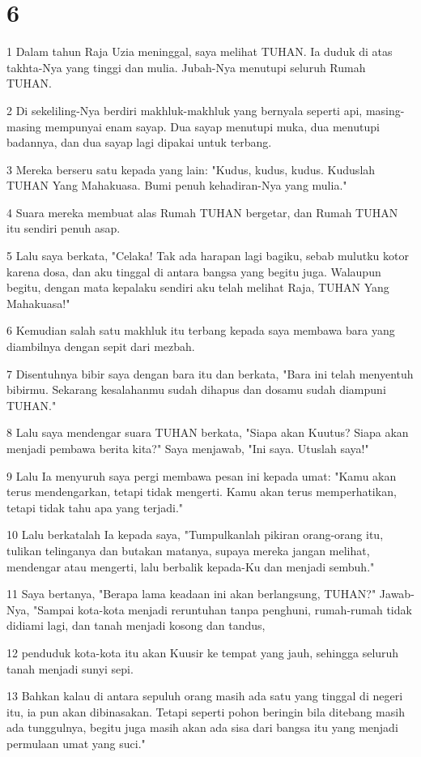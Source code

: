 \chapter{6}

\par 1 Dalam tahun Raja Uzia meninggal, saya melihat TUHAN. Ia duduk di atas takhta-Nya yang tinggi dan mulia. Jubah-Nya menutupi seluruh Rumah TUHAN.
\par 2 Di sekeliling-Nya berdiri makhluk-makhluk yang bernyala seperti api, masing-masing mempunyai enam sayap. Dua sayap menutupi muka, dua menutupi badannya, dan dua sayap lagi dipakai untuk terbang.
\par 3 Mereka berseru satu kepada yang lain: "Kudus, kudus, kudus. Kuduslah TUHAN Yang Mahakuasa. Bumi penuh kehadiran-Nya yang mulia."
\par 4 Suara mereka membuat alas Rumah TUHAN bergetar, dan Rumah TUHAN itu sendiri penuh asap.
\par 5 Lalu saya berkata, "Celaka! Tak ada harapan lagi bagiku, sebab mulutku kotor karena dosa, dan aku tinggal di antara bangsa yang begitu juga. Walaupun begitu, dengan mata kepalaku sendiri aku telah melihat Raja, TUHAN Yang Mahakuasa!"
\par 6 Kemudian salah satu makhluk itu terbang kepada saya membawa bara yang diambilnya dengan sepit dari mezbah.
\par 7 Disentuhnya bibir saya dengan bara itu dan berkata, "Bara ini telah menyentuh bibirmu. Sekarang kesalahanmu sudah dihapus dan dosamu sudah diampuni TUHAN."
\par 8 Lalu saya mendengar suara TUHAN berkata, "Siapa akan Kuutus? Siapa akan menjadi pembawa berita kita?" Saya menjawab, "Ini saya. Utuslah saya!"
\par 9 Lalu Ia menyuruh saya pergi membawa pesan ini kepada umat: "Kamu akan terus mendengarkan, tetapi tidak mengerti. Kamu akan terus memperhatikan, tetapi tidak tahu apa yang terjadi."
\par 10 Lalu berkatalah Ia kepada saya, "Tumpulkanlah pikiran orang-orang itu, tulikan telinganya dan butakan matanya, supaya mereka jangan melihat, mendengar atau mengerti, lalu berbalik kepada-Ku dan menjadi sembuh."
\par 11 Saya bertanya, "Berapa lama keadaan ini akan berlangsung, TUHAN?" Jawab-Nya, "Sampai kota-kota menjadi reruntuhan tanpa penghuni, rumah-rumah tidak didiami lagi, dan tanah menjadi kosong dan tandus,
\par 12 penduduk kota-kota itu akan Kuusir ke tempat yang jauh, sehingga seluruh tanah menjadi sunyi sepi.
\par 13 Bahkan kalau di antara sepuluh orang masih ada satu yang tinggal di negeri itu, ia pun akan dibinasakan. Tetapi seperti pohon beringin bila ditebang masih ada tunggulnya, begitu juga masih akan ada sisa dari bangsa itu yang menjadi permulaan umat yang suci."

